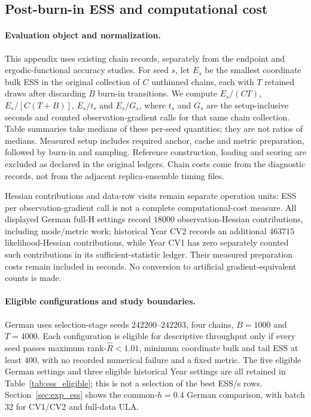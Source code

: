 \clearpage
\subsection{Post-burn-in ESS and computational cost}\label{app:ess_cost}
\paragraph{Evaluation object and normalization.}
This appendix uses existing chain records, separately from the endpoint and ergodic-functional accuracy studies. For seed $s$, let $E_s$ be the smallest coordinate bulk ESS in the original collection of $C$ unthinned chains, each with $T$ retained draws after discarding $B$ burn-in transitions. We compute $E_s/(CT)$, $E_s/[C(T+B)]$, $E_s/t_s$ and $E_s/G_s$, where $t_s$ and $G_s$ are the setup-inclusive seconds and counted observation-gradient calls for that same chain collection. Table summaries take medians of these per-seed quantities; they are not ratios of medians. Measured setup includes required anchor, cache and metric preparation, followed by burn-in and sampling. Reference construction, loading and scoring are excluded as declared in the original ledgers. Chain costs come from the diagnostic records, not from the adjacent replica-ensemble timing files.

Hessian contributions and data-row visits remain separate operation units: ESS per observation-gradient call is not a complete computational-cost measure. All displayed German full-H settings record $18000$ observation-Hessian contributions, including mode/metric work; historical Year CV2 records an additional $463715$ likelihood-Hessian contributions, while Year CV1 has zero separately counted such contributions in its sufficient-statistic ledger. Their measured preparation costs remain included in seconds. No conversion to artificial gradient-equivalent counts is made.

\paragraph{Eligible configurations and study boundaries.}
German uses selection-stage seeds $242200$--$242203$, four chains, $B=1000$ and $T=4000$. Each configuration is eligible for descriptive throughput only if every seed passes maximum rank-$\widehat R<1.01$, minimum coordinate bulk and tail ESS at least $400$, with no recorded numerical failure and a fixed metric. The five eligible German settings and three eligible historical Year settings are all retained in Table~\ref{tab:ess_eligible}; this is not a selection of the best ESS/s rows. Section~\ref{sec:exp_ess} shows the common-$h=0.4$ German comparison, with batch $32$ for CV1/CV2 and full-data ULA.

